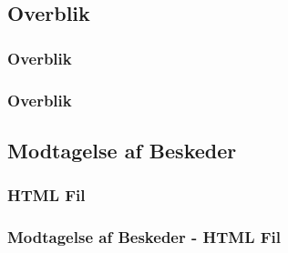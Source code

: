 \subsection{Overblik}
\begin{frame}
    \frametitle{Overblik}
    \vspace{10mm}
    \begin{center}
    \end{center}
\end{frame}
\begin{frame}
    \frametitle{Overblik}
    \vspace{10mm}
    \begin{center}
    \end{center}
\end{frame}

\subsection{Modtagelse af Beskeder}
\subsubsection{HTML Fil}
\begin{frame}
    \frametitle{Modtagelse af Beskeder - HTML Fil}
    \vspace{-1mm}
    \inputminted[fontsize=\footnotesize,breaklines=true,highlightlines={11}]{html}{../src/frontend/part4_recv/index.html}
\end{frame}
